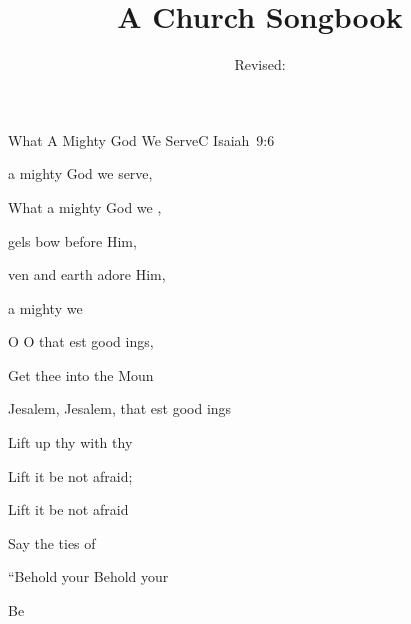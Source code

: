 \documentclass[12pt]{book}
\title{A Church Songbook}
\author{}
\date{Revised:  \RevDate}
\newcommand{\RevDate}{\today}
\newcommand{\NotCCLIed}{\relax}
\begin{document}
\maketitle

\mainmatter
\ifWordBk
  \twocolumn
\fi

\begin{song}{What A Mighty God We Serve}{C}
  {\SBPubDom}
  {}
  {Isaiah~9:6}
  {\NotCCLIed}

  \renewcommand{\RevDate}{February~11,~1993}

  \begin{SBOpGroup}
     a mighty God we serve,
    
    What a mighty God we ,
    
    gels bow before Him,
    
    ven and earth adore Him,
    
     a mighty  we \Ch{[}{} \Ch{]}{}
  \end{SBOpGroup}

  \begin{SBVerse}
    O  O  that est good ings,

    Get thee  into the  Moun

    Jesalem, Jesalem, that est good ings

    Lift up thy  with  thy 

    Lift it  be not afraid;

    Lift it  be not afraid

    Say  the ties of 

    ``Behold your  Behold your 

    Be  
  \end{SBVerse}

  \begin{SBExtraKeys}{
  \CBPageBrk
  \CSColBrk

}
\end{SBExtraKeys}
\end{song}
\end{document}
